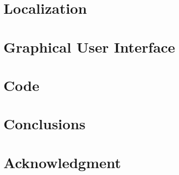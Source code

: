 \documentclass[journal]{IEEEtran}
\begin{document}
\section{Localization}
  

\section{Graphical User Interface}
  
  
\newpage
\section{Code}
  

\section{Conclusions}
  

\appendices


\section*{Acknowledgment}
  



\ifCLASSOPTIONcaptionsoff
  \newpage
\fi







%
%


\end{document}
